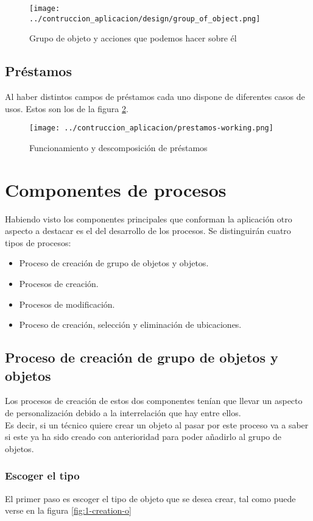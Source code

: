 \begin{figure}[ht]
    \centering
    \texttt{[image: ../contruccion\_aplicacion/design/group\_of\_object.png]}
    \caption{Grupo de objeto y acciones que podemos hacer sobre él}\label{fig:group-of-object-unit}
\end{figure}


\subsection{Préstamos}
Al haber distintos campos de préstamos cada uno dispone de diferentes casos de usos. Estos son los de la figura \ref{fig:loans-diagram}.

\begin{figure}[ht]
    \centering
    \texttt{[image: ../contruccion\_aplicacion/prestamos-working.png]}
    \caption{Funcionamiento y descomposición de préstamos}\label{fig:loans-diagram}
\end{figure}

\section{Componentes de procesos}
Habiendo visto los componentes principales que conforman la aplicación otro aspecto a destacar es el del desarrollo de los procesos. Se distinguirán cuatro tipos de procesos:
\begin{itemize}
    \item Proceso de creación de grupo de objetos y objetos.
    \item Procesos de creación.
    \item Procesos de modificación.
    \item Proceso de creación, selección y eliminación de ubicaciones.
\end{itemize}

\subsection{Proceso de creación de grupo de objetos y objetos}
Los procesos de creación de estos dos componentes tenían que llevar un aspecto de personalización debido a la interrelación que hay entre ellos.
\\Es decir, si un técnico quiere crear un objeto al pasar por este proceso va a saber si este ya ha sido creado con anterioridad para poder añadirlo al grupo de objetos.
\subsubsection{Escoger el tipo}
El primer paso es escoger el tipo de objeto que se desea crear, tal como puede verse en la figura \ref{fig:1-creation-o}

